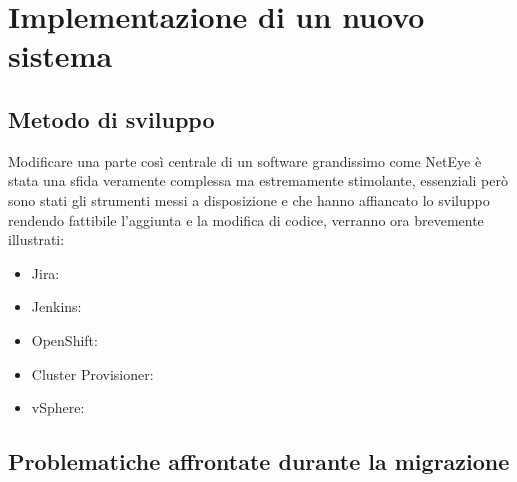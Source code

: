 \section{Implementazione di un nuovo sistema}
\label{sec:nuovo_sistema}

\subsection{Metodo di sviluppo}
\label{sub:sviluppo}

Modificare una parte così centrale di un software grandissimo come NetEye è stata
una sfida veramente complessa ma estremamente stimolante, essenziali però sono
stati gli strumenti messi a disposizione e che hanno affiancato lo sviluppo
rendendo fattibile l'aggiunta e la modifica di codice, verranno ora brevemente illustrati:
\begin{itemize}
  \item Jira:

  \item Jenkins:

  \item OpenShift:

  \item Cluster Provisioner:

  \item vSphere:
\end{itemize}

\subsection{Problematiche affrontate durante la migrazione}
\label{sub:problemi}